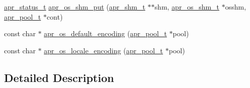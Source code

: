 \begin{DoxyCompactItemize}
\item 
\hyperlink{group__apr__errno_gaf76ee4543247e9fb3f3546203e590a6c}{apr\-\_\-status\-\_\-t} \hyperlink{group__apr__portabile_gaac2b48e4ea4ac8f959cd0e78ede6c5f2}{apr\-\_\-os\-\_\-shm\-\_\-put} (\hyperlink{group__apr__shm_ga79e8c16bdeaf7ade4ef0f935249e7c2f}{apr\-\_\-shm\-\_\-t} $\ast$$\ast$shm, \hyperlink{group__apr__portabile_ga7af1085d6390fbd08d66482b8c17de51}{apr\-\_\-os\-\_\-shm\-\_\-t} $\ast$osshm, \hyperlink{group__apr__pools_gaf137f28edcf9a086cd6bc36c20d7cdfb}{apr\-\_\-pool\-\_\-t} $\ast$cont)
\item 
const char $\ast$ \hyperlink{group__apr__portabile_ga6e21845a4a5f3b7dd107b2beea50c91e}{apr\-\_\-os\-\_\-default\-\_\-encoding} (\hyperlink{group__apr__pools_gaf137f28edcf9a086cd6bc36c20d7cdfb}{apr\-\_\-pool\-\_\-t} $\ast$pool)
\item 
const char $\ast$ \hyperlink{group__apr__portabile_gaf4c49baaf6cb115c6c92e74e4a40fd46}{apr\-\_\-os\-\_\-locale\-\_\-encoding} (\hyperlink{group__apr__pools_gaf137f28edcf9a086cd6bc36c20d7cdfb}{apr\-\_\-pool\-\_\-t} $\ast$pool)
\end{DoxyCompactItemize}


\subsection{Detailed Description}


